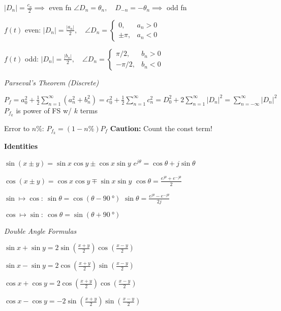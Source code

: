 \documentclass[twocolumn]{article}
\begin{document}
$|D_n| = \frac{c_n}{2} \implies$ even fn \hfill $\angle D_n = \theta_n, \quad D_{-n} = -\theta_n \implies$ odd fn

$f(t)$ even: $|D_n| = \frac{|a_n|}{2}, \quad \angle D_n = \begin{cases} 0, & a_n > 0 \\ \pm \pi, & a_n < 0 \end{cases}$

$f(t)$ odd: $|D_n| = \frac{|b_n|}{2}, \quad \angle D_n = \begin{cases} \pi/2, & b_n > 0 \\ -\pi/2, & b_n < 0 \end{cases}$

\dotfill

\textit{Parseval's Theorem (Discrete)}

$P_f = a_0^2 + \frac{1}{2} \sum_{n=1}^\infty (a_n^2 + b_n^2) = c_0^2 + \frac{1}{2} \sum_{n=1}^\infty c_n^2 = D_0^2 + 2 \sum_{n=1}^\infty |D_n|^2 = \sum_{n=-\infty}^\infty |D_n|^2$ \hfill $P_{f_k}$ is power of FS w/ $k$ terms

Error to $n$\%: $P_{f_k} = (1-n\%) P_f$ \hfill \textbf{Caution:} Count the const term!

\vspace{-.5em}
\dotfill

\textbf{Identities}

$\sin(x \pm y) = \sin x \cos y \pm \cos x \sin y$ \hfill $e^{j\theta} = \cos \theta + j \sin \theta$

$\cos(x \pm y) = \cos x \cos y \mp \sin x \sin y$ \hfill $\cos \theta = \frac{e^{j\theta} + e^{-j\theta}}{2}$

$\sin \mapsto \cos:\ \sin \theta = \cos\left(\theta - \SI{90}{\degree}\right)$ \hfill $\sin \theta = \frac{e^{j\theta} - e^{-j\theta}}{2j}$

$\cos \mapsto \sin:\ \cos \theta = \sin\left(\theta + \SI{90}{\degree}\right)$

\vspace{-.5em}
\dotfill

\textit{Double Angle Formulas}

$\sin x + \sin y = 2 \sin \left( \frac{x+y}{2} \right) \cos \left( \frac{x-y}{2} \right)$

$\sin x - \sin y = 2 \cos \left( \frac{x+y}{2} \right) \sin \left( \frac{x-y}{2} \right)$

$\cos x + \cos y = 2 \cos \left( \frac{x+y}{2} \right) \cos \left( \frac{x-y}{2} \right)$

$\cos x - \cos y = -2 \sin \left( \frac{x+y}{2} \right) \sin \left( \frac{x-y}{2} \right)$
\end{document}
